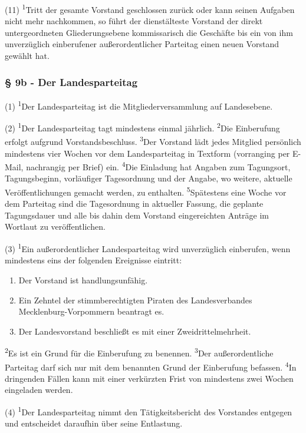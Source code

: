 (11) \textsuperscript{1}Tritt der gesamte Vorstand geschlossen zurück
oder kann seinen Aufgaben nicht mehr nachkommen, so führt der
dienstälteste Vorstand der direkt untergeordneten Gliederungsebene
kommissarisch die Geschäfte bis ein von ihm unverzüglich einberufener
außerordentlicher Parteitag einen neuen Vorstand gewählt hat.

\subsubsection{§ 9b - Der Landesparteitag}

(1) \textsuperscript{1}Der Landesparteitag ist die Mitgliederversammlung
auf Landesebene.

(2) \textsuperscript{1}Der Landesparteitag tagt mindestens einmal
jährlich. \textsuperscript{2}Die Einberufung erfolgt aufgrund
Vorstandsbeschluss. \textsuperscript{3}Der Vorstand lädt jedes Mitglied
persönlich mindestens vier Wochen vor dem Landesparteitag in Textform
(vorranging per E-Mail, nachrangig per Brief) ein.
\textsuperscript{4}Die Einladung hat Angaben zum Tagungsort,
Tagungsbeginn, vorläufiger Tagesordnung und der Angabe, wo weitere,
aktuelle Veröffentlichungen gemacht werden, zu enthalten.
\textsuperscript{5}Spätestens eine Woche vor dem Parteitag sind die
Tagesordnung in aktueller Fassung, die geplante Tagungsdauer und alle
bis dahin dem Vorstand eingereichten Anträge im Wortlaut zu
veröffentlichen.

(3) \textsuperscript{1}Ein außerordentlicher Landesparteitag wird
unverzüglich einberufen, wenn mindestens eins der folgenden Ereignisse
eintritt:

\begin{enumerate}
\item
  Der Vorstand ist handlungsunfähig.
\item
  Ein Zehntel der stimmberechtigten Piraten des Landesverbandes
  Mecklenburg-Vorpommern beantragt es.
\item
  Der Landesvorstand beschließt es mit einer Zweidrittelmehrheit.
\end{enumerate}
\textsuperscript{2}Es ist ein Grund für die Einberufung zu benennen.
\textsuperscript{3}Der außerordentliche Parteitag darf sich nur mit dem
benannten Grund der Einberufung befassen. \textsuperscript{4}In
dringenden Fällen kann mit einer verkürzten Frist von mindestens zwei
Wochen eingeladen werden.

(4) \textsuperscript{1}Der Landesparteitag nimmt den Tätigkeitsbericht
des Vorstandes entgegen und entscheidet daraufhin über seine Entlastung.

